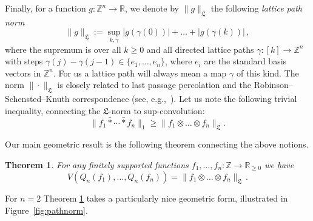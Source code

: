 \documentclass[a4paper,reqno,12pt]{amsart}
\newtheorem{theorem}{Theorem}
\newcommand{\LL}{\mathfrak{L}}
\newcommand{\z}{\mathbb{Z}}
\renewcommand{\r}{\mathbb{R}}
\newcommand{\1}{\bo{1}}
\begin{document}
Finally, for a function $g\colon \z^n\to \r$, we denote by $\|g\|_{\LL}$ the following \emph{lattice path norm}
	\begin{equation}\label{eq:latticenormrecap}
	\|g\|_{\LL}:=\sup_{k,\gamma}
	|g(\gamma(0))|+\dots+|g(\gamma(k))|\,,
	\end{equation}
where the supremum is over all $k \ge 0$ and all directed lattice paths $\gamma\colon[k]\to \z^n$ with steps $\gamma(j)-\gamma(j-1)\in \{e_1, \dots, e_n\}$, where $e_i$ are the standard basis vectors in $\z^n$. For us a lattice path will always mean a map $\gamma$ of this kind. The norm $\|\cdot\|_{\LL}$ is closely related to last passage percolation and the Robinson--Schensted--Knuth correspondence (see, e.g.,~\cite[Ch. 4.2, Ch. 5.2]{Rom}). Let us note the following trivial inequality, connecting the $\LL$-norm to sup-convolution:
	\begin{equation}\label{ineq:trivialLlwouerbound}
	\|f_1\bar{*}\cdots\bar{*}f_n\|_1 \geq \|f_1 \otimes \dots \otimes f_n\|_{\LL}.
	\end{equation}

Our main geometric result is the following theorem connecting the above notions.

\begin{theorem} \label{thm:mvformula}
For any finitely supported functions $f_1,\dots,f_n\colon\z\to\r_{\ge0}$ we have
    \begin{equation}\label{eq:mvformula}
    V(Q_n(f_1),\dots,Q_n(f_n))
     = \|f_1\otimes \dots \otimes f_n\|_{\LL}\,.
    \end{equation}
\end{theorem}
\noindent For $n=2$ Theorem \ref{thm:mvformula} takes a particularly nice geometric form, illustrated in Figure~\ref{fig:pathnorm}. 
\end{document}
